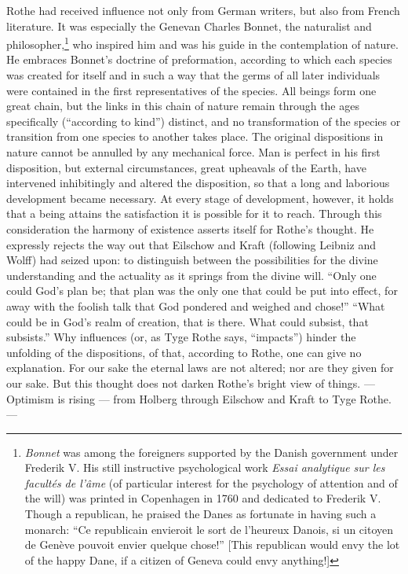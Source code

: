 \documentclass[12pt,a4paper]{book}
\newcommand{\opage}[1]{\marginnote{\footnotesize\textit{[#1]}}}
\begin{document}
Rothe had received influence not only from German writers, but also from French
literature. It was especially the Genevan Charles Bonnet, the naturalist and
philosopher,\footnote{\emph{Bonnet} was among the foreigners supported by the Danish
government under Frederik V. His still instructive psychological work \emph{Essai
analytique sur les facultés de l'âme} (of particular interest for the psychology of
attention and of the will) was printed in Copenhagen in 1760 and dedicated to
Frederik V. Though a republican, he praised the Danes as fortunate in having such a
monarch: ``Ce republicain envieroit le sort de l'heureux Danois, si un citoyen de
Genève pouvoit envier quelque chose!'' [This republican would envy the lot of the
happy Dane, if a citizen of Geneva could envy anything!]} who inspired him and was
his guide in the contemplation of nature. He embraces Bonnet's doctrine of
preformation, according to which each species was created for itself and in such a
way that the germs of all later individuals were contained in the first
representatives of the species. All beings form one great chain, but the links in
this chain of nature remain through the ages specifically (``according to kind'')
distinct, and no transformation of the species or transition from one species to
another takes place. The original dispositions in nature cannot be annulled by any
mechanical force. Man is perfect in his first disposition, but external
circumstances, great upheavals of the Earth, have intervened inhibitingly and
altered the disposition, so that a long and laborious development became necessary.
At every stage of development, however, it holds that a being attains the
satisfaction it is possible for it to reach. Through this consideration the harmony
of existence asserts itself for Rothe's thought. He expressly rejects the way out
that Eilschow and Kraft (following Leibniz and Wolff) had seized upon: to
distinguish between the possibilities for the divine understanding and the actuality
as it springs from the divine will. ``Only one could God's plan be; that plan was
the only one that could be put into effect, for \opage{33}away with the foolish talk that God
pondered and weighed and chose!'' ``What could be in God's realm of creation, that
is there. What could subsist, that subsists.'' Why influences (or, as Tyge Rothe
says, ``impacts'') hinder the unfolding of the dispositions, of that, according to
Rothe, one can give no explanation. For our sake the eternal laws are not altered;
nor are they given for our sake. But this thought does not darken Rothe's bright
view of things. --- Optimism is rising --- from Holberg through Eilschow and Kraft
to Tyge Rothe. ---
\end{document}
